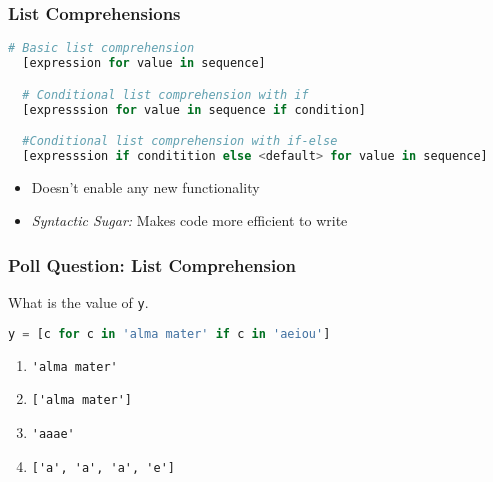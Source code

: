 \documentclass{beamer}
\begin{document}
%
%
\begin{frame}[fragile]
  \frametitle{List Comprehensions}
  \begin{lstlisting}[language=Python, autogobble]
  # Basic list comprehension
  [expression for value in sequence]

  # Conditional list comprehension with if
  [expresssion for value in sequence if condition]

  #Conditional list comprehension with if-else
  [expresssion if conditition else <default> for value in sequence]
  \end{lstlisting}
  \vfill
  \begin{itemize}
    \item Doesn't enable any new functionality 
    \item \textit{Syntactic Sugar: } Makes code more efficient to write
  \end{itemize}
\end{frame}

%
%
\begin{frame}[fragile]
  \frametitle{Poll Question: List Comprehension}
  What is the value of \lstinline|y|.
  \begin{lstlisting}[language=Python, autogobble]
  y = [c for c in 'alma mater' if c in 'aeiou']
  \end{lstlisting}
  \vfill
  \begin{enumerate}[A]
    \item \lstinline|'alma mater'|
    \item \lstinline|['alma mater']|
    \item \lstinline|'aaae'|
    \item \lstinline|['a', 'a', 'a', 'e']|
  \end{enumerate}
\end{frame}
\end{document}
